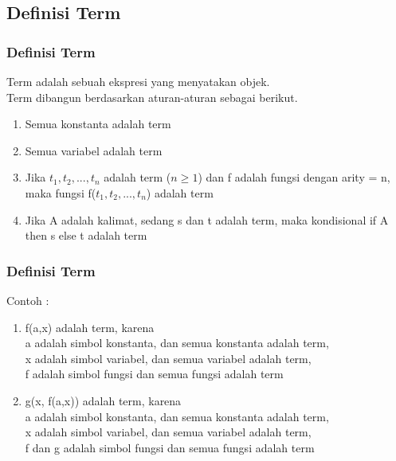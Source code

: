 \documentclass[handout]{beamer}
\theoremstyle{definition}
\theoremstyle{example}
\begin{document}
\subsection{Definisi Term}
\begin{frame}
	\frametitle{Definisi Term}
	Term adalah sebuah ekspresi yang menyatakan objek.\\
	Term dibangun berdasarkan aturan-aturan sebagai berikut.\\
	\begin{enumerate}
		\item Semua konstanta adalah term
		\item Semua variabel adalah term
		\item Jika $t_1, t_2, ..., t_n$ adalah term ($n \geq 1$) dan f adalah fungsi dengan arity = n,
	maka fungsi f($t_1,t_2, ..., t_n$) adalah term
		\item Jika A adalah kalimat, sedang s dan t adalah term, maka kondisional if A
	then s else t adalah term
    \end{enumerate}
\end{frame}	

\begin{frame}
	\frametitle{Definisi Term}
    Contoh :\\
    \begin{enumerate} 
    	\item  f(a,x) adalah term, karena\\
    a adalah simbol konstanta, dan semua konstanta adalah term,\\
    x adalah simbol variabel, dan semua variabel adalah term,\\
    f adalah simbol fungsi dan semua fungsi adalah term
    	\item  g(x, f(a,x)) adalah term, karena\\
    a adalah simbol konstanta, dan semua konstanta adalah term,\\
    x adalah simbol variabel, dan semua variabel adalah term,\\
    f dan g adalah simbol fungsi dan semua fungsi adalah term\\
    \end{enumerate}
\end{frame}	
\end{document}
